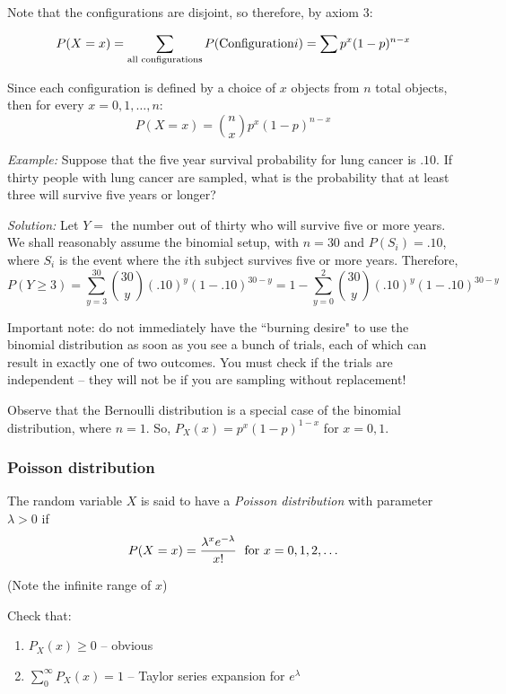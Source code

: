 \documentclass[12pt]{article}
\begin{document}
Note that the configurations are disjoint, so therefore, by axiom 3:

\[
	P(X = x) = \sum_{\textnormal{all configurations}} P(\textnormal{Configuration} i) = \sum p^x (1-p)^{n-x}
\]

Since each configuration is defined by a choice of $x$ objects from $n$ total objects, then for every $x = 0, 1, \ldots, n$:
\[
	P (X = x) = {n \choose x} p^x (1-p)^{n-x}
\]

\emph{Example:} Suppose that the five year survival probability for lung cancer is $.10$. If thirty people with lung cancer are sampled, what is the probability that at least three will survive five years or longer?

\emph{Solution:} Let $Y =$ the number out of thirty who will survive five or more years. We shall reasonably assume the binomial setup, with $n = 30$ and $P(S_i) = .10$, where $S_i$ is the event where the $i$th subject survives five or more years. Therefore,
\[
	P(Y \geq 3) = \sum_{y=3}^{30} {30 \choose y} (.10)^y (1-.10)^{30-y} = 1 - \sum_{y=0}^{2} {30 \choose y} (.10)^y (1-.10)^{30-y}
\]

Important note: do not immediately have the ``burning desire" to use the binomial distribution as soon as you see a bunch of trials, each of which can result in exactly one of two outcomes. You must check if the trials are independent -- they will not be if you are sampling without replacement!

Observe that the Bernoulli distribution is a special case of the binomial distribution, where $n = 1$. So, $P_X (x) = p^x (1-p)^{1-x}$ for $x = 0,1$.


\subsubsection{Poisson distribution}

The random variable $X$ is said to have a \emph{Poisson distribution} with parameter $\lambda > 0$ if
\[
	P(X = x) = \frac{ \lambda^x e^{- \lambda}}{x!} \; \textnormal{ for } x = 0,1,2,\ldots
\]

(Note the infinite range of $x$)

Check that:
\begin{enumerate}
	\item $P_X (x) \geq 0$ -- obvious
	\item $\sum_0^{\infty} P_X (x) = 1$ -- Taylor series expansion for $e^{\lambda}$
\end{enumerate}
\end{document}
